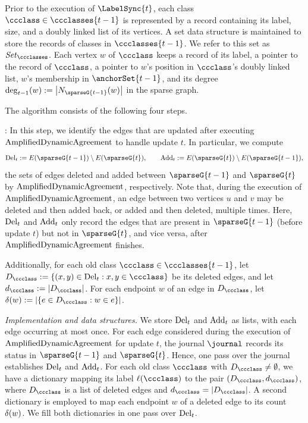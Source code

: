Prior to the execution of $ \LabelSync{t} $, each class $ \ccclass \in \ccclasses{t-1} $ is represented by a record containing its label, size, and a doubly linked list of its vertices.
A set data structure is maintained to store the records of classes in $ \ccclasses{t-1} $.
We refer to this set as $ \setClasses$.
Each vertex $ w $ of $ \ccclass $ keeps a record of its label, a pointer to the record of $ \ccclass $, a pointer to $ w $'s position in $ \ccclass $'s doubly linked list, $ w $'s membership in $ \anchorSet{t-1} $, and its degree $ \deg_{t-1}(w):=\card{\openN{\sparseG{t-1}}{w}} $ in the sparse graph.

The algorithm consists of the following four steps.

\noindent{}:
In this step, we identify the edges that are updated after executing $ \mathrm{AmplifiedDynamicAgreement} $ to handle update $ t $.
In particular, we compute
\begin{align}
    \delt{t}:=E(\sparseG{t-1})\setminus E(\sparseG{t}), \nonumber
    \qquad
    \addt{t}:=E(\sparseG{t})\setminus E(\sparseG{t-1}), \nonumber
\end{align}
the sets of edges deleted and added between $ \sparseG{t-1} $ and $ \sparseG{t} $ by $ \mathrm{AmplifiedDynamicAgreement} $, respectively.
Note that, during the execution of $ \mathrm{AmplifiedDynamicAgreement} $, an edge between two vertices $ u $ and $ v $ may be deleted and then added back, or added and then deleted, multiple times.
Here, $ \mathrm{Del}_{t} $ and $ \mathrm{Add}_{t} $ only record the edges that are present in $ \sparseG{t-1} $ (before update $ t $) but not in $ \sparseG{t} $, and vice versa, after $ \mathrm{AmplifiedDynamicAgreement} $ finishes.

Additionally, for each old class $ \ccclass\in\ccclasses{t-1} $, let $ D_{\ccclass}:=\{(x,y)\in\delt{t}:x,y\in\ccclass\} $ be its deleted edges, and let $ d_{\ccclass}:=\card{D_{\ccclass}} $.
For each endpoint $ w $ of an edge in $ D_{\ccclass} $, let $ \delIncEdge{w}:=\card{\{e\in D_{\ccclass}:w\in e\}} $.

\textit{Implementation and data structures.}
We store $ \mathrm{Del}_{t} $ and $ \mathrm{Add}_{t} $ as lists, with each edge occurring at most once.
For each edge considered during the execution of $ \mathrm{AmplifiedDynamicAgreement} $ for update $ t $, the journal $ \journal $ records its status in $ \sparseG{t-1} $ and $ \sparseG{t} $.
Hence, one pass over the journal establishes $ \mathrm{Del}_{t} $ and $ \mathrm{Add}_{t} $.
For each old class $ \ccclass $ with $ D_{\ccclass}\ne\emptyset $, we have a dictionary mapping its label $ \complabel(\ccclass) $ to the pair $ (D_{\ccclass},d_{\ccclass}) $, where $ D_{\ccclass} $ is a list of deleted edges and $ d_{\ccclass}=\card{D_{\ccclass}} $.
A second dictionary is employed to map each endpoint $ w $ of a deleted edge to its count $ \delta(w) $.
We fill both dictionaries in one pass over $ \mathrm{Del}_{t} $.

